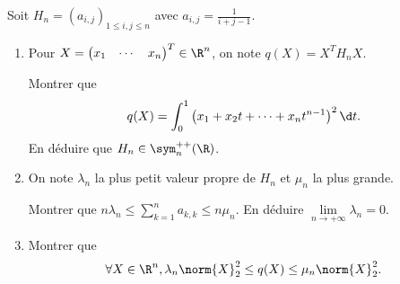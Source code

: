 \begin{enonce}
\begin{exercise}[ID={RMS135 E1295},subtitle={Centrale PSI 2024},tags={oraux},difficulty={}]
  Soit $H_n=\left( a_{i,j} \right)_{1\leq i,j\leq n}$ avec $a_{i,j} = \frac{1}{i+j-1}$.

  \begin{enumerate}
    \item Pour $X=\begin{pmatrix} x_1& \cdots & x_n \end{pmatrix}^T \in\R^n$, on note $q(X) = X^T H_n X$.

        Montrer que
        \begin{equation*}
          q(X) = \int_0^1 \left( x_1 + x_2 t + \dots + x_n t^{n-1} \right)^2 \d t.
        \end{equation*}
        En déduire que $H_n \in\sym_n^{++}(\R)$.

    \item On note $\lambda_n$ la plus petit valeur propre de $H_n$ et $\mu_n$ la plus grande.

      Montrer que $n\lambda_n \leq \sum\limits_{k=1}^n a_{k,k} \leq n \mu_n$.
      En déduire $\lim\limits_{n\to+\infty} \lambda_n = 0$.


    \item Montrer que
      \begin{equation*}
        \forall X\in\R^n, \lambda_n \norm{X}_2^2 \leq q(X) \leq \mu_n \norm{X}_2^2.
      \end{equation*}
  \end{enumerate}
\end{exercise}
\begin{solution}
\end{solution}
\end{enonce}
